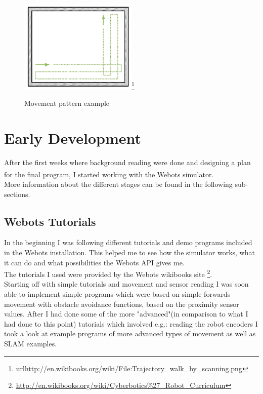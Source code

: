 \documentclass[10pt,a4paper]{article}
\begin{document}
\begin{flushleft}
\begin{figure}[h]
\centering
\includegraphics[width=0.5\textwidth]{figures/Trajectory_walk_by_scanning.png}\footnote{url{http://en.wikibooks.org/wiki/File:Trajectory\_walk\_by\_scanning.png}} 
\caption{Movement pattern example}
\label{Figure 3}
\end{figure}

\section{Early Development}
After the first weeks where background reading were done and designing a plan for the final program, I started working with the Webots\textsuperscript{\texttrademark} simulator. \\ More information about the different stages can be found in the following sub-sections. 

\subsection{Webots Tutorials}
In the beginning I was following different tutorials and demo  programs included in the Webots installation. 
This helped me to see how the simulator works, what it can do and what possibilities the Webots API gives me. \\
The tutorials I used were provided by the Webots wikibooks site \footnote{\url{http://en.wikibooks.org/wiki/Cyberbotics\%27_Robot_Curriculum}}.\\
Starting off with simple tutorials and movement and sensor reading I was soon able to implement simple programs which were based on simple forwards movement with obstacle avoidance functions, based on the proximity sensor values. 
After I had done some of the more "advanced"(in comparison to what I had done to this point) tutorials which involved e.g.: reading the robot encoders   I took a look at example programs of more advanced types of movement as well as SLAM examples. \\


\end{flushleft}
\end{document}
